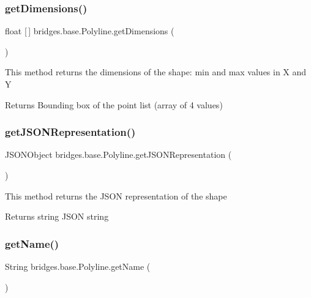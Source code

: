 \subsubsection{\texorpdfstring{getDimensions()}{getDimensions()}}
{\footnotesize\ttfamily float \mbox{[}$\,$\mbox{]} bridges.\+base.\+Polyline.\+get\+Dimensions (\begin{DoxyParamCaption}{ }\end{DoxyParamCaption})}

This method returns the dimensions of the shape\+: min and max values in X and Y

\begin{DoxyReturn}{Returns}
Bounding box of the point list (array of 4 values) 
\end{DoxyReturn}
\mbox{\label{classbridges_1_1base_1_1_polyline_a4ac266909645f8db9b7fcc4836f6069a}} 
\subsubsection{\texorpdfstring{getJSONRepresentation()}{getJSONRepresentation()}}
{\footnotesize\ttfamily J\+S\+O\+N\+Object bridges.\+base.\+Polyline.\+get\+J\+S\+O\+N\+Representation (\begin{DoxyParamCaption}{ }\end{DoxyParamCaption})}

This method returns the J\+S\+ON representation of the shape

\begin{DoxyReturn}{Returns}
string J\+S\+ON string 
\end{DoxyReturn}
\mbox{\label{classbridges_1_1base_1_1_polyline_a5b56cee642a6381ea940c75a336076ea}} 
\subsubsection{\texorpdfstring{getName()}{getName()}}
{\footnotesize\ttfamily String bridges.\+base.\+Polyline.\+get\+Name (\begin{DoxyParamCaption}{ }\end{DoxyParamCaption})}

